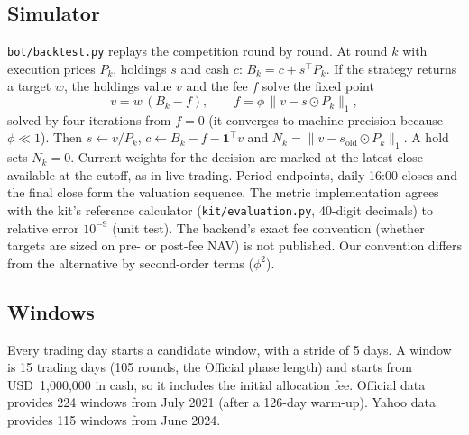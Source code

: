 \documentclass[11pt,a4paper]{article}
\newcommand{\code}[1]{\texttt{#1}}
\begin{document}
\subsection{Simulator}
\code{bot/backtest.py} replays the competition round by round. At round $k$ with execution prices $P_k$, holdings $s$
and cash $c$: $B_k=c+s^\top P_k$. If the strategy returns a target $w$, the holdings value $v$ and the fee $f$ solve the
fixed point
\begin{equation}
  v=w\,(B_k-f),\qquad f=\phi\,\|v-s\odot P_k\|_1,
\end{equation}
solved by four iterations from $f=0$ (it converges to machine precision because $\phi\ll1$). Then $s\leftarrow v/P_k$,
$c\leftarrow B_k-f-\mathbf 1^\top v$ and $N_k=\|v-s_{\text{old}}\odot P_k\|_1$. A hold sets $N_k=0$. Current weights for the
decision are marked at the latest close available at the cutoff, as in live trading. Period endpoints, daily 16:00
closes and the final close form the valuation sequence. The metric implementation agrees with the kit's reference
calculator (\code{kit/evaluation.py}, 40-digit decimals) to relative error $10^{-9}$ (unit test). The backend's exact fee
convention (whether targets are sized on pre- or post-fee NAV) is not published. Our convention differs from the
alternative by second-order terms ($\phi^2$).

\subsection{Windows}
Every trading day starts a candidate window, with a stride of 5 days. A window is 15 trading days (105 rounds, the
Official phase length) and starts from USD~1{,}000{,}000 in cash, so it includes the initial allocation fee. Official
data provides 224 windows from July 2021 (after a 126-day warm-up). Yahoo data provides 115 windows from June 2024.
\end{document}
